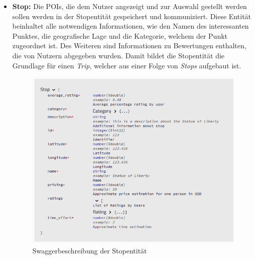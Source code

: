 	\begin{itemize}
		\item \textbf{Stop:} Die POIs, die dem Nutzer angezeigt und zur Auswahl gestellt werden sollen werden in der Stopentität gespeichert und kommuniziert. Diese Entität beinhaltet alle notwendigen Informationen, wie den Namen des interessanten Punktes, die geografische Lage und die Kategorie, welchem der Punkt zugeordnet ist. Des Weiteren sind Informationen zu Bewertungen enthalten, die von Nutzern abgegeben wurden. Damit bildet die Stopentität die Grundlage für einen \textit{Trip}, welcher aus einer Folge von \textit{Stops} aufgebaut ist. 
		
		\newpage
		
		\begin{figure}[ht!]
			\centering
			\includegraphics[width=1\textwidth]{images/swagger_stop_entity.png}
			\caption{Swaggerbeschreibung der Stopentität}
			\label{fig:swagger_stop}
		\end{figure} 
		

\end{itemize}
